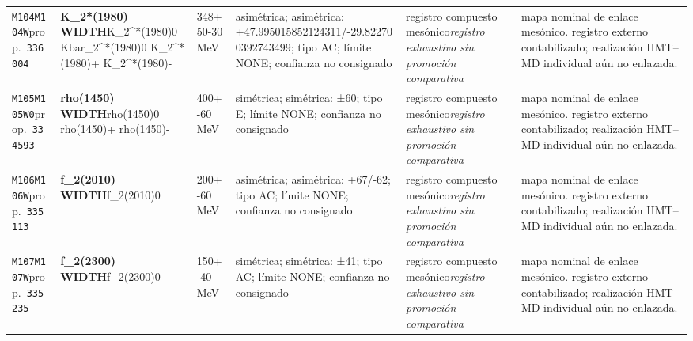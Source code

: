 \begin{landscape}
\begin{longtable}{L{1.85cm}L{4.45cm}L{2.35cm}L{4.05cm}L{3.35cm}L{7.15cm}}
\texttt{M104}\newline \texttt{M104W}\newline prop.\ \texttt{336004} & \textbf{K\_\allowbreak{}2*(1980) WIDTH}\newline K\_\allowbreak{}2\textasciicircum{}*(1980)0 \textbar{}\allowbreak{} Kbar\_\allowbreak{}2\textasciicircum{}*(1980)0 \textbar{}\allowbreak{} K\_\allowbreak{}2\textasciicircum{}*(1980)+ \textbar{}\allowbreak{} K\_\allowbreak{}2\textasciicircum{}*(1980)- & 348+50-30\,MeV & asimétrica; asimétrica: +47.995015852124311/-29.822700392743499; tipo AC; límite NONE; confianza no consignado & registro compuesto mesónico\newline \emph{registro exhaustivo sin promoción comparativa} & mapa nominal de enlace mesónico. registro externo contabilizado; realización HMT--MD individual aún no enlazada. \\
\texttt{M105}\newline \texttt{M105W0}\newline prop.\ \texttt{334593} & \textbf{rho(1450) WIDTH}\newline rho(1450)0 \textbar{}\allowbreak{} rho(1450)+ \textbar{}\allowbreak{} rho(1450)- & 400+-60\,MeV & simétrica; simétrica: ±60; tipo E; límite NONE; confianza no consignado & registro compuesto mesónico\newline \emph{registro exhaustivo sin promoción comparativa} & mapa nominal de enlace mesónico. registro externo contabilizado; realización HMT--MD individual aún no enlazada. \\
\texttt{M106}\newline \texttt{M106W}\newline prop.\ \texttt{335113} & \textbf{f\_\allowbreak{}2(2010) WIDTH}\newline f\_\allowbreak{}2(2010)0 & 200+-60\,MeV & asimétrica; asimétrica: +67/-62; tipo AC; límite NONE; confianza no consignado & registro compuesto mesónico\newline \emph{registro exhaustivo sin promoción comparativa} & mapa nominal de enlace mesónico. registro externo contabilizado; realización HMT--MD individual aún no enlazada. \\
\texttt{M107}\newline \texttt{M107W}\newline prop.\ \texttt{335235} & \textbf{f\_\allowbreak{}2(2300) WIDTH}\newline f\_\allowbreak{}2(2300)0 & 150+-40\,MeV & simétrica; simétrica: ±41; tipo AC; límite NONE; confianza no consignado & registro compuesto mesónico\newline \emph{registro exhaustivo sin promoción comparativa} & mapa nominal de enlace mesónico. registro externo contabilizado; realización HMT--MD individual aún no enlazada. \\

\end{longtable}
\end{landscape}
